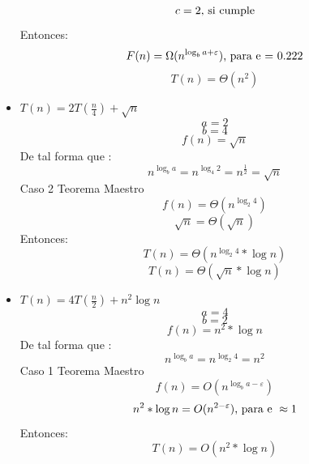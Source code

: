 \documentclass[10pt,a4paper]{article}
\begin{document}
\begin{itemize}
			\begin{equation*}
				c = 2 \textup {, si cumple}
			\end{equation*}
			Entonces:
			\begin{equation*}
				F(n) = \Omega (n^{\log_{b}{a}+\varepsilon})  \textup{, para e = 0.222}
			\end{equation*}
			\begin{equation*}
				T(n) = \Theta(n^{2})
			\end{equation*}
		\item $T(n) = 2T(\frac{n}{4})+\sqrt{n}$
			\begin{equation*}
				a = 2
			\end{equation*}
			\begin{equation*}
				b = 4
			\end{equation*}
			\begin{equation*}
				f(n) = \sqrt{n}
			\end{equation*}
			De tal forma que :
			\begin{equation*}
				n^{\log_{b}{a}} = n^{\log_{4}{2}} = n^{\frac{1}{2}} = \sqrt{n}
			\end{equation*}
			Caso 2 Teorema Maestro
			\begin{equation*}
				f(n) = \Theta (n^{\log_{2}{4}})
			\end{equation*}
			\begin{equation*}
				\sqrt{n} = \Theta (\sqrt{n})
			\end{equation*}
			Entonces:
			\begin{equation*}
				T(n) = \Theta(n^{\log_{2}{4}}*\log{n})
			\end{equation*}
			\begin{equation*}
				T(n) = \Theta(\sqrt{n}*\log{n})
			\end{equation*}
			
		\item $T(n) = 4T(\frac{n}{2})+n^{2}\log{n}$
			\begin{equation*}
				a = 4
			\end{equation*}
			\begin{equation*}
				b = 2
			\end{equation*}
			\begin{equation*}
				f(n) = n^{2}*\log{n}
			\end{equation*}
			De tal forma que :
			\begin{equation*}
				n^{\log_{b}{a}} = n^{\log_{2}{4}} = n^{2}
			\end{equation*}
			Caso 1 Teorema Maestro
			\begin{equation*}
				f(n) = O(n^{\log_{b}{a}-\varepsilon})
			\end{equation*}
			\begin{equation*}
				n^{2}*\log{n} = O(n^{2-\varepsilon})\textup{, para e } \approx 1
			\end{equation*}
			Entonces:
			\begin{equation*}
				T(n) = O(n^{2}*\log{n})
			\end{equation*}
			

\end{itemize}
\end{document}
